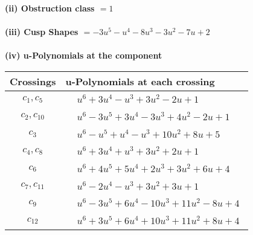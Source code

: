 \documentclass[1p]{elsarticle_modified}
\theoremstyle{definition}
\begin{document}
\flushleft \textbf{(ii) Obstruction class $= 1$}\\~\\
\flushleft \textbf{(iii) Cusp Shapes $= -3 u^5- u^4-8 u^3-3 u^2-7 u+2$}\\~\\
\newpage\renewcommand{\arraystretch}{1}
\flushleft \textbf{(iv) u-Polynomials at the component}\newline \\
\begin{tabular}{m{50pt}|m{274pt}}
Crossings & \hspace{64pt}u-Polynomials at each crossing \\
\hline $$\begin{aligned}c_{1},c_{5}\end{aligned}$$&$\begin{aligned}
&u^6+3 u^4- u^3+3 u^2-2 u+1
\end{aligned}$\\
\hline $$\begin{aligned}c_{2},c_{10}\end{aligned}$$&$\begin{aligned}
&u^6-3 u^5+3 u^4-3 u^3+4 u^2-2 u+1
\end{aligned}$\\
\hline $$\begin{aligned}c_{3}\end{aligned}$$&$\begin{aligned}
&u^6- u^5+u^4- u^3+10 u^2+8 u+5
\end{aligned}$\\
\hline $$\begin{aligned}c_{4},c_{8}\end{aligned}$$&$\begin{aligned}
&u^6+3 u^4+u^3+3 u^2+2 u+1
\end{aligned}$\\
\hline $$\begin{aligned}c_{6}\end{aligned}$$&$\begin{aligned}
&u^6+4 u^5+5 u^4+2 u^3+3 u^2+6 u+4
\end{aligned}$\\
\hline $$\begin{aligned}c_{7},c_{11}\end{aligned}$$&$\begin{aligned}
&u^6-2 u^4- u^3+3 u^2+3 u+1
\end{aligned}$\\
\hline $$\begin{aligned}c_{9}\end{aligned}$$&$\begin{aligned}
&u^6-3 u^5+6 u^4-10 u^3+11 u^2-8 u+4
\end{aligned}$\\
\hline $$\begin{aligned}c_{12}\end{aligned}$$&$\begin{aligned}
&u^6+3 u^5+6 u^4+10 u^3+11 u^2+8 u+4
\end{aligned}$\\
\hline
\end{tabular}\\~\\
\end{document}
